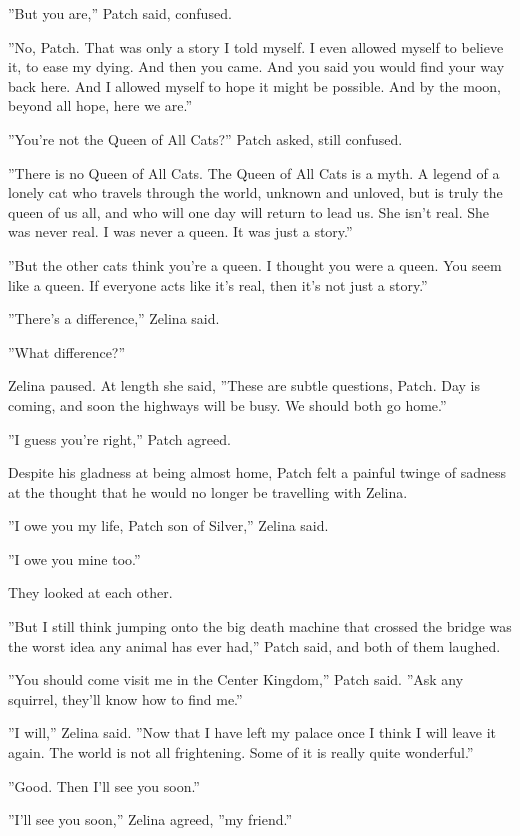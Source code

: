 \documentclass[12pt]{book}
\begin{document}
''But you are,'' Patch said, confused.

''No, Patch. That was only a story I told myself. I even allowed myself to believe it, to ease my dying. And then you came. And you said you would find your way back here. And I allowed myself to hope it might be possible. And by the moon, beyond all hope, here we are.''

''You're not the Queen of All Cats?'' Patch asked, still confused.

''There is no Queen of All Cats. The Queen of All Cats is a myth. A legend of a lonely cat who travels through the world, unknown and unloved, but is truly the queen of us all, and who will one day will return to lead us. She isn't real. She was never real. I was never a queen. It was just a story.''

''But the other cats think you're a queen. I thought you were a queen. You seem like a queen. If everyone acts like it's real, then it's not just a story.''

''There's a difference,'' Zelina said.

''What difference?''

Zelina paused. At length she said, ''These are subtle questions, Patch. Day is coming, and soon the highways will be busy. We should both go home.''

''I guess you're right,'' Patch agreed.

Despite his gladness at being almost home, Patch felt a painful twinge of sadness at the thought that he would no longer be travelling with Zelina.

''I owe you my life, Patch son of Silver,'' Zelina said.

''I owe you mine too.''

They looked at each other.

''But I still think jumping onto the big death machine that crossed the bridge was the worst idea any animal has ever had,'' Patch said, and both of them laughed.

''You should come visit me in the Center Kingdom,'' Patch said. ''Ask any squirrel, they'll know how to find me.''

''I will,'' Zelina said. ''Now that I have left my palace once I think I will leave it again. The world is not all frightening. Some of it is really quite wonderful.''

''Good. Then I'll see you soon.''

''I'll see you soon,'' Zelina agreed, ''my friend.''
\end{document}
